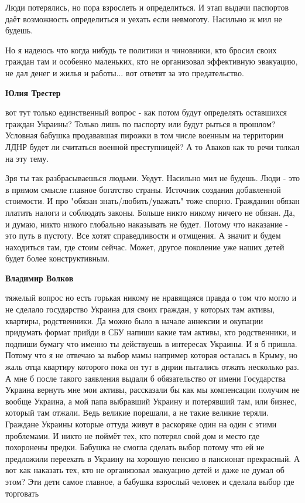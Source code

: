 \begin{itemize}
Люди потерялись, но пора взрослеть и определиться. И этап выдачи паспортов даёт
возможность определиться и уехать если невмоготу.  Насильно ж мил не будешь. 

Но я надеюсь что когда нибудь те политики и чиновники, кто бросил своих граждан
там и особенно маленьких, кто не организовал эффективную эвакуацию, не дал
денег и жилья и работы... вот ответят за это предательство.

\begin{itemize} %
\textbf{Юлия Трестер} 

вот тут только единственный вопрос - как потом будут определять оставшихся
граждан Украины? Только лишь по паспорту или будут рыться в прошлом? Условная
бабушка продававшая пирожки в том числе военным на территории ЛДНР будет ли
считаться военной преступницей? А то Аваков как то речи толкал на эту тему.


Зря ты так разбрасываешься людьми. Уедут. Насильно мил не будешь. Люди - это в
прямом смысле главное богатство страны. Источник создания добавленной
стоимости. И про "обязан знать/любить/уважать" тоже спорно. Гражданин обязан
платить налоги и соблюдать законы. Больше никто никому ничего не обязан. Да, и
думаю, никто никого глобально наказывать не будет. Потому что наказание - это
путь в пустоту. Все хотят справедливости и отмщения. А значит и будем
находиться там, где стоим сейчас. Может, другое поколение уже наших детей будет
более конструктивным.

\textbf{Владимир Волков} 

тяжелый вопрос но есть горькая никому не нравящаяся правда о том что могло и не
сделало государство Украина для своих граждан, у которых там активы, квартиры,
родственники. Да можно было в начале аннексии и окупации придумать формат
прийди в СБУ напиши какие там активы, кто родственники, и подпиши бумагу что
именно ты действуешь в интересах Украины. И я б пришла. Потому что я не отвечаю
за выбор мамы например которая осталась в Крыму, но жаль отца квартиру которого
пока он тут в днрии пытались отжать несколько раз. А мне б после такого
заявления выдали б обязательство от имени Государства Украина вернуть мне мои
активы, рассказали бы как мы компенсации получим не вообще Украина, а мой папа
выбравший Украину и потерявший там, или бизнес, который там отжали. Ведь
великие порешали, а не такие великие теряли. Граждане Украины которые оттуда
живут в раскоряке один на один с этими проблемами. И никто не поймёт тех, кто
потерял свой дом и место где похоронены предки. Бабушка не смогла сделать выбор
потому что ей не предложили переехать в Украину на хорошую пенсию в пансионат
прекрасный. А вот как наказать тех, кто не организовал эвакуацию детей и даже
не думал об этом? Эти дети самое главное, а бабушка взрослый человек и сделала
выбор где торговать


\end{itemize}
\end{itemize}
